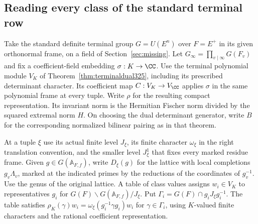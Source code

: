 \documentclass[a4paper,11pt]{article}
\theoremstyle{definition}
\theoremstyle{remark}
\numberwithin{equation}{section}
\begin{document}
\subsection{Reading every class of the standard terminal row}\label{nav:VII-69}
Take the standard definite terminal group \(G=U(E^n)\) over
\(F=E^+\) in its given orthonormal frame, on a field of
Section~\ref{sec:missing}. Let \(G_\infty=\prod_{v\mid\infty}G(F_v)\)
and fix a coefficient-field embedding \(\sigma:K\to\CC\).
Use the terminal polynomial module \(V_K\) of
Theorem~\ref{thm:terminaldual325}, including its prescribed
determinant character. Its coefficient map \(C:V_K\to
V_\CC\) applies \(\sigma\) in the same polynomial frame at
every tuple. Write \(\rho\) for the resulting compact
representation. Its invariant norm is the Hermitian Fischer
norm divided by the squared extremal norm \(H\). On choosing
the dual determinant generator, write \(B\) for the
corresponding normalized bilinear pairing as in that theorem.

At a tuple \(\xi\) use its actual finite level \(J_\xi\),
its finite character \(\omega_\xi\) in the right translation
convention, and the smaller level \(J_\xi^1\) that fixes
every marked residue frame. Given \(g\in G(\mathbb A_{F,f})\),
write \(D_\xi(g)\) for the lattice with local completions
\(g_v\Lambda_v\), marked at the indicated primes by the
reductions of the coordinates of \(g_v^{-1}\). Use the
genus of the original lattice. A table of class values
assigns \(w_i\in V_K\) to representatives \(g_i\) for
\(G(F)\backslash G(\mathbb A_{F,f})/J_\xi\).
Put \(\Gamma_i=G(F)\cap g_iJ_\xi g_i^{-1}\).
The table satisfies
\(\rho_K(\gamma)w_i=\omega_\xi(g_i^{-1}\gamma g_i)w_i\)
for \(\gamma\in\Gamma_i\), using \(K\)-valued finite
characters and the rational coefficient representation.
\end{document}
